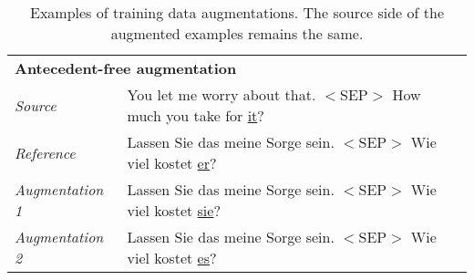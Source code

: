 \begin{table}[ht]
	\small
	\centering	
	\begin{tabular}{l l}
		
		\multicolumn{2}{l}{\textbf{Antecedent-free augmentation}} \\
		\textit{Source} &
		You let me worry about that. $<$SEP$>$ How much you take for \underline{it}? \\
		\textit{Reference} &
		Lassen Sie das meine Sorge sein. $<$SEP$>$ Wie viel kostet \underline{er}? \\
		\textit{Augmentation 1} &
		Lassen Sie das meine Sorge sein. $<$SEP$>$ Wie viel kostet \underline{sie}? \\
		\textit{Augmentation 2} &
		Lassen Sie das meine Sorge sein. $<$SEP$>$ Wie viel kostet \underline{es}? \\
	\end{tabular}
	\caption{Examples of training data augmentations. The source side of the augmented examples remains the same.}
	\label{table:manual-examples-augmentations-main}
\end{table}
